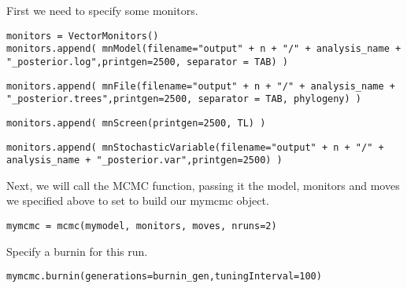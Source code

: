 First we need to specify some monitors. 
{\tt \begin{Snugshade}[184,207,236]
\begin{lstlisting}
monitors = VectorMonitors()
monitors.append( mnModel(filename="output" + n + "/" + analysis_name + "_posterior.log",printgen=2500, separator = TAB) )
\end{lstlisting}
\end{Snugshade}}
{\tt \begin{Snugshade}[184,207,236]
\begin{lstlisting}
monitors.append( mnFile(filename="output" + n + "/" + analysis_name + "_posterior.trees",printgen=2500, separator = TAB, phylogeny) )
\end{lstlisting}
\end{Snugshade}}
{\tt \begin{Snugshade}[184,207,236]
\begin{lstlisting}
monitors.append( mnScreen(printgen=2500, TL) )
\end{lstlisting}
\end{Snugshade}}
{\tt \begin{Snugshade}[184,207,236]
\begin{lstlisting}
monitors.append( mnStochasticVariable(filename="output" + n + "/" + analysis_name + "_posterior.var",printgen=2500) )
\end{lstlisting}
\end{Snugshade}}


Next, we will call the MCMC function, passing it the model, monitors and moves we specified above to set 
to build our mymcmc object.
 
{\tt \begin{Snugshade}[184,207,236]
\begin{lstlisting}
mymcmc = mcmc(mymodel, monitors, moves, nruns=2)
\end{lstlisting}
\end{Snugshade}}

Specify a burnin for this run.

{\tt \begin{Snugshade}[184,207,236]
\begin{lstlisting}
mymcmc.burnin(generations=burnin_gen,tuningInterval=100)
\end{lstlisting}
\end{Snugshade}}

